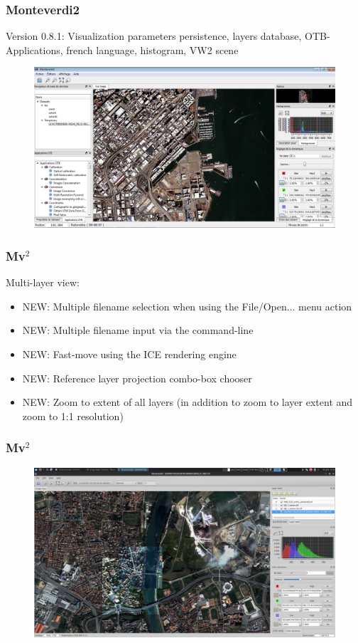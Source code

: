 \documentclass[8pt]{beamer}
\begin{document}
\begin{frame}
\frametitle{Monteverdi2}
Version 0.8.1: Visualization parameters persistence, layers database, OTB-Applications, french language, histogram, VW2 scene 
\begin{figure}[hbtp]
    \centering
    \includegraphics[scale=0.3]{images/MVD2.png} 
\end{figure}
\end{frame}

\begin{frame}
\frametitle{Mv$^{2}$}
Multi-layer view:
\begin{itemize}
 \item NEW: Multiple filename selection when using the File/Open... menu action
 \item NEW: Multiple filename input via the command-line
 \item NEW: Fast-move using the ICE rendering engine
 \item NEW: Reference layer projection combo-box chooser
 \item NEW: Zoom to extent of all layers (in addition to zoom to layer extent and zoom to 1:1 resolution)
\end{itemize}
\end{frame}


\begin{frame}
\frametitle{Mv$^{2}$}
\begin{figure}[hbtp]
    \centering
    \includegraphics[scale=0.17]{images/2015-06-01_Multi-layer_1.png} 
\end{figure}
\end{frame}
\end{document}
